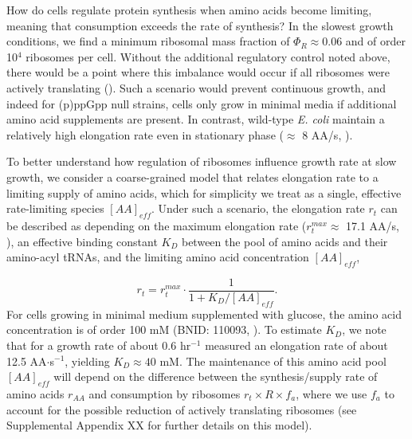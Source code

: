 How do cells regulate protein synthesis when amino acids become limiting,
meaning that consumption exceeds the rate of synthesis? In the slowest  growth
conditions, we find a minimum ribosomal mass fraction of $\Phi_R \approx 0.06$
and  of order 10$^4$ ribosomes per cell.   Without the additional regulatory
control noted above, there would be a point where  this imbalance would occur if
all ribosomes were actively translating  (). Such a
scenario would prevent continuous growth, and indeed for (p)ppGpp null strains,
cells only grow in minimal media if additional amino acid supplements are
present. In contrast, wild-type \textit{E. coli} maintain a relatively high
elongation rate even in stationary phase ($\approx$ 8 AA/s, \citep{dai2016,
dai2018}).

To better understand how regulation of ribosomes influence growth rate at
slow growth, we consider a coarse-grained model that relates elongation
rate to a limiting supply of amino acids, which for simplicity we treat as a
single, effective rate-limiting species $[AA]_{eff}$. Under such a scenario, the elongation
rate $r_t$ can be described as depending on the maximum elongation rate ($r_t^{max}
\approx$ 17.1 AA/s, \citep{dai2016, dai2018}), an effective binding constant
$K_D$ between the pool of amino acids and their amino-acyl tRNAs, and the limiting
amino acid concentration $[AA]_{eff}$,

\begin{equation}
r_t = r_t^{max} \cdot \frac{1}{1 + K_D / [AA]_{eff}}.
\label{eq:rate_Kd}
\end{equation}
For cells growing in minimal medium supplemented with glucose, the amino acid
concentration is of order 100 mM (BNID: 110093, \citep{milo2010, bennett2009}).
To estimate  $K_D$, we note that for a growth rate of about 0.6 hr$^{-1}$
\cite{dai2016} measured an elongation rate of about 12.5 AA$\cdot$s$^{-1}$,
yielding $K_D \approx 40$ mM. The maintenance of this amino acid pool
$[AA]_{eff}$ will depend on the difference between the synthesis/supply rate of
amino acids $r_{AA}$ and consumption by ribosomes $r_t \times R \times f_a$,
where we use $f_a$ to account for the possible reduction of actively translating
ribosomes (see Supplemental Appendix XX for further details on this model).

